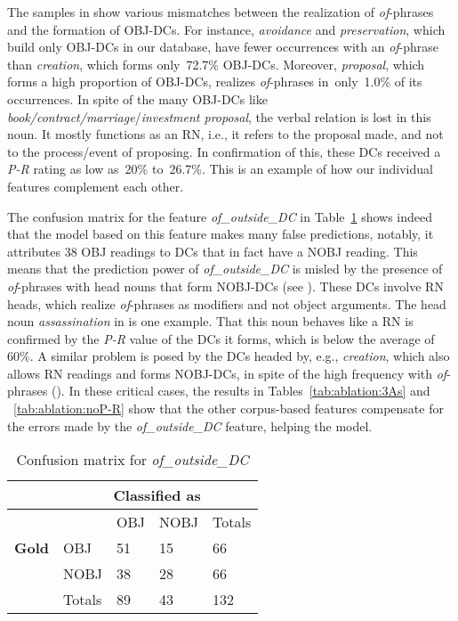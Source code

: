 \documentclass[output=paper]{langsci/langscibook}
\begin{document}
The samples  in  show various mismatches between the realization of \textit{of}-phrases and the formation of OBJ-DCs. For instance, \textit{avoidance} and \textit{preservation}, which build only OBJ-DCs in our database, have fewer occurrences with an \textit{of}-phrase than \textit{creation}, which forms only~72.7\% OBJ-DCs. Moreover, \textit{proposal}, which forms a high proportion of OBJ-DCs, realizes \textit{of}-phrases  in~only~1.0\% of its occurrences. In spite of the many OBJ-DCs like  \textit{book/contract/marriage}/\textit{investment proposal}, the verbal relation is lost in this noun. It mostly functions as an RN, i.e., it refers to the proposal made, and not to the process/event of proposing. In confirmation of this, these DCs received a \textit{P-R} rating as low as~20\% to~26.7\%.
This is an example of how our individual features complement each other. 

The confusion matrix for the feature \textit{of\_outside\_DC} in Table~\ref{tab:conf:of-outside} shows indeed that the model based on this feature makes many false predictions, notably, it attributes 38 OBJ readings to DCs that in fact have a NOBJ reading. This means that the prediction power of \textit{of\_outside\_DC} is misled by the presence of \textit{of}-phrases with head nouns that form NOBJ-DCs (see ). These DCs involve RN heads, which realize \textit{of}-phrases as modifiers and not object arguments. The head noun \textit{assassination} in  is one example. That this noun behaves like a RN is confirmed by the \textit{P-R} value of the DCs it forms, which is below the average of 60\%. A similar problem is posed by the DCs headed by, e.g., \textit{creation}, which also allows RN readings and forms NOBJ-DCs, in spite of the high frequency with \textit{of}-phrases (). In these critical cases, the results in Tables~\ref{tab:ablation:3As} and ~\ref{tab:ablation:noP-R} show that the other corpus-based features compensate for the errors made by the \textit{of\_outside\_DC} feature, helping the model.


\begin{table}
\caption{\label{tab:conf:of-outside}Confusion matrix for \textit{of\_outside\_DC}}
{\footnotesize
\begin{tabular}{|l|l|l|l|l|}
\hline
&\multicolumn{4}{c|}{\textbf{Classified as}}\\
\hline
&&  OBJ&NOBJ&Totals \\   
\textbf{Gold} & OBJ &51 &15&66 \\
& NOBJ&38 & 28&66  \\\hline
&Totals&89 &43&132\\
\hline
\end{tabular}}
\end{table}
\end{document}
